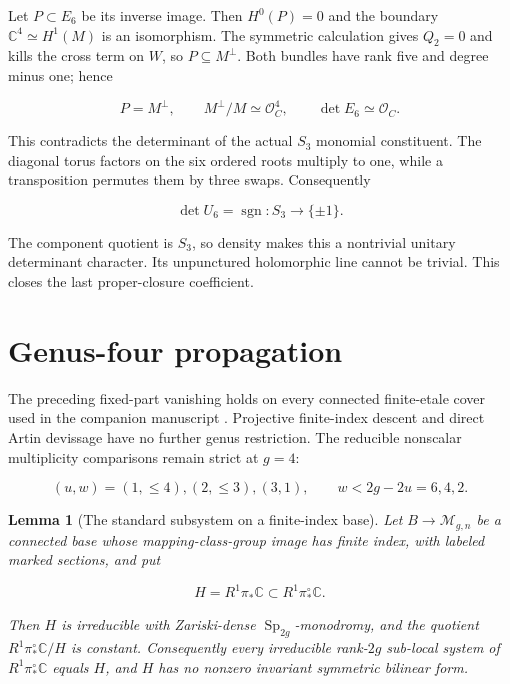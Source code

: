 \documentclass[11pt]{article}
\newtheorem{lemma}[theorem]{Lemma}
\theoremstyle{definition}
\newcommand{\Sp}{\operatorname{Sp}}
\begin{document}
Let \(P\subset E_6\) be its inverse image. Then \(H^0(P)=0\) and the
boundary \(\mathbb C^4\simeq H^1(M)\) is an isomorphism. The symmetric
calculation gives \(Q_2=0\) and kills the cross term on \(W\), so
\(P\subseteq M^\perp\). Both bundles have rank five and degree minus
one; hence

\[P=M^\perp,
\qquad M^\perp/M\simeq\mathcal O_C^4,
\qquad \det E_6\simeq\mathcal O_C.\]

This contradicts the determinant of the actual \(S_3\) monomial
constituent. The diagonal torus factors on the six ordered roots
multiply to one, while a transposition permutes them by three swaps.
Consequently

\[\det U_6=\operatorname{sgn}:S_3\longrightarrow\{\pm1\}.\]

The component quotient is \(S_3\), so density makes this a nontrivial
unitary determinant character. Its unpunctured holomorphic line cannot
be trivial. This closes the last proper-closure coefficient.

\section{Genus-four propagation}\label{genus-four-propagation}

The preceding fixed-part vanishing holds on every connected finite-etale
cover used in the companion manuscript \cite{SneidermanG5}. Projective
finite-index descent and direct
Artin devissage have no further genus restriction. The reducible
nonscalar multiplicity comparisons remain strict at \(g=4\):

\[(u,w)=(1,\le4),(2,\le3),(3,1),
\qquad
w<2g-2u=6,4,2.\]

\begin{lemma}[The standard subsystem on a finite-index base]
\label{lem:finite-index-standard}
Let \(B\to\mathcal M_{g,n}\) be a connected base whose mapping-class-group
image has finite index, with labeled marked sections, and put

\[H=R^1\pi_*\mathbb C\subset R^1\pi_*^\circ\mathbb C.\]

Then \(H\) is irreducible with Zariski-dense \(\Sp_{2g}\)-monodromy, and
the quotient \(R^1\pi_*^\circ\mathbb C/H\) is constant.  Consequently
every irreducible rank-\(2g\) sub-local system of
\(R^1\pi_*^\circ\mathbb C\) equals \(H\), and \(H\) has no nonzero
invariant symmetric bilinear form.
\end{lemma}
\end{document}
